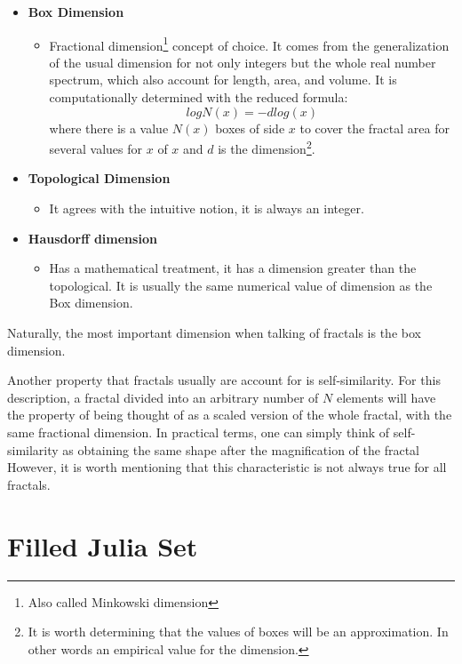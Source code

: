 \documentclass{article}
\begin{document}
\begin{itemize}
    \item \textbf{Box Dimension}
    \begin{itemize}
        \item Fractional dimension\footnote{Also called Minkowski dimension} concept of choice. It comes from the generalization of the usual dimension for not only integers but the whole real number spectrum, which also account for length, area, and volume. It is computationally determined with the reduced formula:
        \begin{equation}
            log N(x)=- dlog(x)
        \end{equation}
         where there is a value $N(x)$ boxes of side $x$ to cover the fractal area for several values for $x$ of $x$ and $d$ is the dimension\footnote{It is worth determining that the values of boxes will be an approximation. In other words an empirical value for the dimension.}.
    \end{itemize}
   
    \item \textbf{Topological Dimension}
    \begin{itemize}
        \item It agrees with the intuitive notion, it is always an integer. 
    \end{itemize}
    \item \textbf{Hausdorff dimension}
    \begin{itemize}
        \item Has a mathematical treatment, it has a dimension greater than the topological. It is usually the same numerical value of dimension as the Box dimension.
    \end{itemize}
\end{itemize}

Naturally, the most important dimension when talking of fractals is the box dimension.

Another property that fractals usually are account for is self-similarity. For this description, a fractal divided into an arbitrary number of $N$ elements will have the property of being thought of as a scaled version of the whole fractal, with the same fractional dimension\cite{Crownover}. In practical terms, one can simply think of self-similarity as obtaining the same shape after the magnification of the fractal However, it is worth mentioning that this characteristic is not always true for all fractals.


\newpage
\section{Filled Julia Set}
\end{document}
